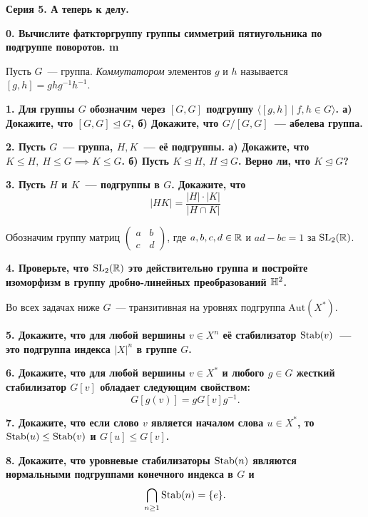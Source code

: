 \documentclass[12pt]{article}
\begin{document}
	\centerline{\bf{Серия 5. А теперь к делу. }}

	\bf{0.}  Вычислите фаткторгруппу группы симметрий пятиугольника по подгруппе поворотов. m

	\begin{definition} 
		Пусть $G$~--- группа. \emph{Коммутатором} элементов $g$ и $h$ называется $[g, h] = g h g^{-1} h^{-1}$.
	\end{definition}

	\bf{1.} Для группы $G$ обозначим через $[G, G]$ подгруппу $\langle [g, h] \ \vert \ f, h \in G \rangle$. а) Докажите, что $[G, G] \trianglelefteq G$, б) Докажите, что $G/[G, G]$~--- абелева группа. 

	\bf{2.} Пусть $G$~--- группа, $H, K$~--- её подгруппы. а) Докажите, что $K \le H, \ H \le G \implies K \le G$. б) Пусть $K \trianglelefteq  H, \ H \trianglelefteq  G$. Верно ли, что $K \trianglelefteq  G$?

	\bf{3.} Пусть $H$ и $K$~--- подгруппы в $G$. Докажите, что 
	\[
		|HK| = \frac{|H|\cdot|K|}{|H \cap K|}	
	\]
	\begin{definition} 
		Обозначим группу матриц $\begin{pmatrix} a & b \\ c & d \end{pmatrix}$, где $a, b, c, d \in \mathbb{R}$ и $ad - bc = 1$ за $\mathrm{SL}_{2}(\mathbb{R})$.
	\end{definition}

	\bf{4.} Проверьте, что $\mathrm{SL}_{2}(\mathbb{R})$ это действительно группа и постройте изоморфизм в группу дробно-линейных преобразований $\mathbb{H}^2$. 

	Во всех задачах ниже $G$~--- транзитивная на уровнях подгруппа $\mathrm{Aut}(X^*)$.

	\bf{5.}  Докажите, что для любой вершины $v \in X^n$ её стабилизатор  $\operatorname{Stab}(v)$~--- это подгруппа индекса $|X|^n$ в группе $G$. 

 	\bf{6.} Докажите, что для любой вершины $v \in X^*$ и любого $g \in G$ жесткий стабилизатор $G[v]$ обладает следующим свойством: 
 	\[
 		G[g(v)] = g G[v] g^{-1}.
 	\]

 	\bf{7.} Докажите, что если слово $v$ является началом слова $u \in X^*$, то $\operatorname{Stab}(u) \le \operatorname{Stab}(v)$ и $G[u] \le G[v]$.

 	\bf{8.} Докажите, что уровневые стабилизаторы $\operatorname{Stab}(n)$ являются нормальными подгруппами конечного индекса в $G$ и 
 	\[
 		\bigcap_{n \ge 1} \operatorname{Stab}(n) = \{ e \}.
 	\]



	
\end{document}
